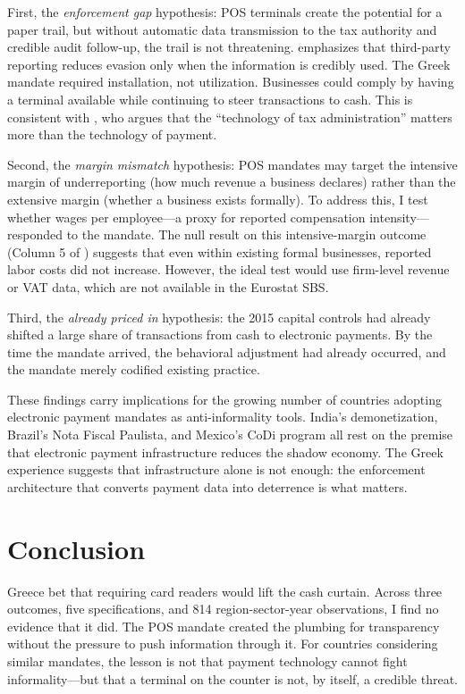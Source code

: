 \documentclass[12pt]{article}
\begin{document}
First, the \textit{enforcement gap} hypothesis: POS terminals create the potential for a paper trail, but without automatic data transmission to the tax authority and credible audit follow-up, the trail is not threatening. \citet{kleven2016can} emphasizes that third-party reporting reduces evasion only when the information is credibly used. The Greek mandate required installation, not utilization. Businesses could comply by having a terminal available while continuing to steer transactions to cash. This is consistent with \citet{slemrod2019tax}, who argues that the ``technology of tax administration'' matters more than the technology of payment.

Second, the \textit{margin mismatch} hypothesis: POS mandates may target the intensive margin of underreporting (how much revenue a business declares) rather than the extensive margin (whether a business exists formally). To address this, I test whether wages per employee---a proxy for reported compensation intensity---responded to the mandate. The null result on this intensive-margin outcome (Column 5 of ) suggests that even within existing formal businesses, reported labor costs did not increase. However, the ideal test would use firm-level revenue or VAT data, which are not available in the Eurostat SBS.

Third, the \textit{already priced in} hypothesis: the 2015 capital controls had already shifted a large share of transactions from cash to electronic payments. By the time the mandate arrived, the behavioral adjustment had already occurred, and the mandate merely codified existing practice.

These findings carry implications for the growing number of countries adopting electronic payment mandates as anti-informality tools. India's demonetization, Brazil's Nota Fiscal Paulista, and Mexico's CoDi program all rest on the premise that electronic payment infrastructure reduces the shadow economy. The Greek experience suggests that infrastructure alone is not enough: the enforcement architecture that converts payment data into deterrence is what matters.


\section{Conclusion}

Greece bet that requiring card readers would lift the cash curtain. Across three outcomes, five specifications, and 814 region-sector-year observations, I find no evidence that it did. The POS mandate created the plumbing for transparency without the pressure to push information through it. For countries considering similar mandates, the lesson is not that payment technology cannot fight informality---but that a terminal on the counter is not, by itself, a credible threat.
\end{document}
